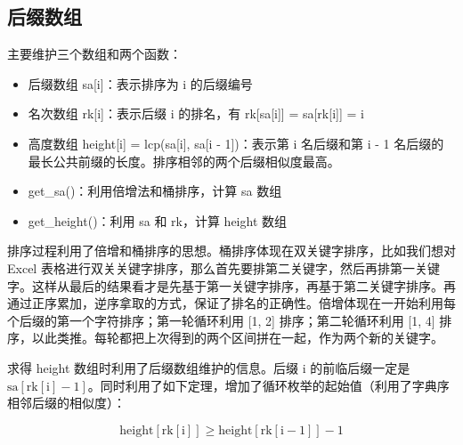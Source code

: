 \documentclass[UTF8]{article}
\begin{document}
\subsection{后缀数组}
主要维护三个数组和两个函数：
\begin{itemize}
	\item 后缀数组 sa[i]：表示排序为 i 的后缀编号
	\item 名次数组 rk[i]：表示后缀 i 的排名，有 rk[sa[i]] = sa[rk[i]] = i
	\item 高度数组 height[i] = lcp(sa[i], sa[i - 1])：表示第 i 名后缀和第 i - 1 名后缀的最长公共前缀的长度。排序相邻的两个后缀相似度最高。
	\item get\_sa()：利用倍增法和桶排序，计算 sa 数组
	\item get\_height()：利用 sa 和 rk，计算 height 数组
\end{itemize}

排序过程利用了倍增和桶排序的思想。桶排序体现在双关键字排序，比如我们想对 Excel 表格进行双关关键字排序，那么首先要排第二关键字，然后再排第一关键字。这样从最后的结果看才是先基于第一关键字排序，再基于第二关键字排序。再通过正序累加，逆序拿取的方式，保证了排名的正确性。倍增体现在一开始利用每个后缀的第一个字符排序；第一轮循环利用 [1, 2] 排序；第二轮循环利用 [1, 4] 排序，以此类推。每轮都把上次得到的两个区间拼在一起，作为两个新的关键字。

求得 height 数组时利用了后缀数组维护的信息。后缀 $\mathrm{i}$ 的前临后缀一定是 $\mathrm{sa[rk[i] - 1]}$。同时利用了如下定理，增加了循环枚举的起始值（利用了字典序相邻后缀的相似度）：

$$
\mathrm{height[rk[i]] \ge height[rk[i - 1]] - 1}
$$
\end{document}
